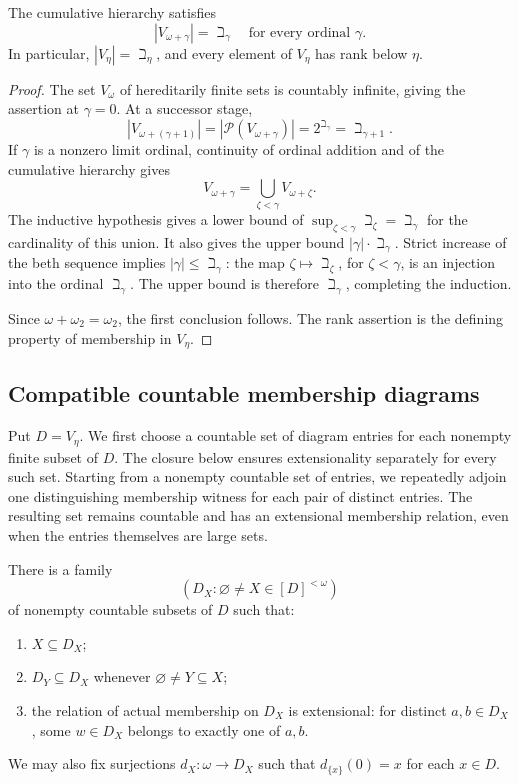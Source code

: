 \begin{lemma}\label{end:hierarchy-size}
The cumulative hierarchy satisfies
\[
  |V_{\omega+\gamma}|=\beth_\gamma
  \quad\text{for every ordinal }\gamma.
\]
In particular, \(|V_\eta|=\beth_\eta\), and every element of \(V_\eta\)
has rank below \(\eta\).
\end{lemma}

\begin{proof}
The set \(V_\omega\) of hereditarily finite sets is countably
infinite, giving the assertion at \(\gamma=0\).  At a successor
stage,
\[
  |V_{\omega+(\gamma+1)}|
  =|\mathcal P(V_{\omega+\gamma})|
  =2^{\beth_\gamma}
  =\beth_{\gamma+1}.
\]
If \(\gamma\) is a nonzero limit ordinal, continuity of ordinal
addition and of the cumulative hierarchy gives
\[
  V_{\omega+\gamma}
  =\bigcup_{\zeta<\gamma} V_{\omega+\zeta}.
\]
The inductive hypothesis gives a lower bound of
\(\sup_{\zeta<\gamma}\beth_\zeta=\beth_\gamma\) for the
cardinality of this union.  It also gives the upper bound
\(|\gamma|\cdot\beth_\gamma\).  Strict increase of the beth
sequence implies \(|\gamma|\leq\beth_\gamma\): the map
\(\zeta\mapsto\beth_\zeta\), for \(\zeta<\gamma\), is an injection
into the ordinal \(\beth_\gamma\).  The upper bound is therefore
\(\beth_\gamma\), completing the induction.

Since \(\omega+\omega_2=\omega_2\), the first conclusion follows.
The rank assertion is the defining property of membership in
\(V_\eta\).
\end{proof}

\subsection{Compatible countable membership diagrams}

Put \(D=V_\eta\).  We first choose a countable set of diagram
entries for each nonempty finite subset of \(D\).  The closure
below ensures extensionality separately for every such set.
Starting from a nonempty countable set of entries, we repeatedly
adjoin one distinguishing membership witness for each pair of
distinct entries. The resulting set remains countable and has an
extensional membership relation, even when the entries themselves
are large sets.

\begin{lemma}\label{end:countable-closures}
There is a family
\[
  (D_X:\varnothing\ne X\in[D]^{<\omega})
\]
of nonempty countable subsets of \(D\) such that:
\begin{enumerate}[label=\textup{(\roman*)}]
  \item \(X\subseteq D_X\);
  \item \(D_Y\subseteq D_X\) whenever
        \(\varnothing\ne Y\subseteq X\);
  \item the relation of actual membership on \(D_X\) is
        extensional: for distinct \(a,b\in D_X\), some
        \(w\in D_X\) belongs to exactly one of \(a,b\).
\end{enumerate}
We may also fix surjections \(d_X:\omega\longrightarrow D_X\)
such that \(d_{\{x\}}(0)=x\) for each \(x\in D\).
\end{lemma}

